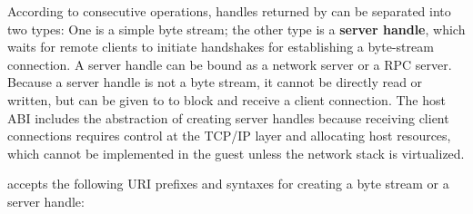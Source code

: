 According to consecutive operations, handles returned by 
can be separated into two types:
One is a simple byte stream;
the other type is a {\bf server handle}, which waits for remote clients to initiate handshakes
for establishing a byte-stream connection.
A server handle can be bound as a network server or a RPC server.
Because a server handle is not a byte stream, it cannot be directly read or written,
but can be given to  to block and receive a client connection.
The host ABI includes the abstraction of creating server handles
because receiving client connections requires control at the TCP/IP layer
and allocating host resources,
which cannot be implemented in the guest unless
the network stack is virtualized.




 accepts the following URI prefixes and syntaxes for creating a byte stream or a server handle:


